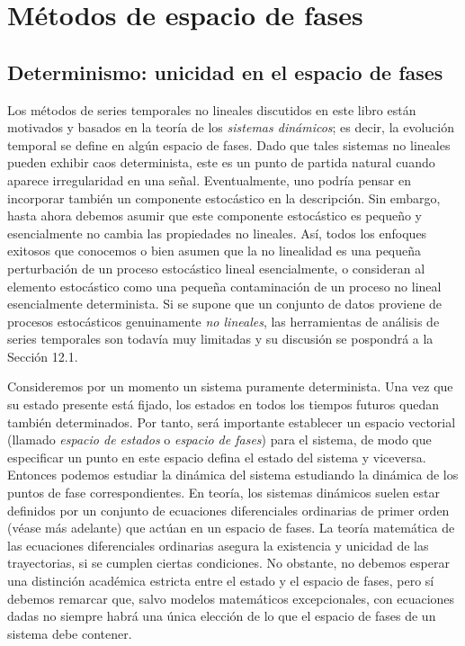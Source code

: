 \documentclass[10pt,a4paper]{book}
\begin{document}
\newpage

\chapter{Métodos de espacio de fases}
\section{Determinismo: unicidad en el espacio de fases}

Los métodos de series temporales no lineales discutidos en este libro están motivados y basados en la teoría de los \textit{sistemas dinámicos}; es decir, la evolución temporal se define en algún espacio de fases. Dado que tales sistemas no lineales pueden exhibir caos determinista, este es un punto de partida natural cuando aparece irregularidad en una señal. Eventualmente, uno podría pensar en incorporar también un componente estocástico en la descripción. Sin embargo, hasta ahora debemos asumir que este componente estocástico es pequeño y esencialmente no cambia las propiedades no lineales. Así, todos los enfoques exitosos que conocemos o bien asumen que la no linealidad es una pequeña perturbación de un proceso estocástico lineal esencialmente, o consideran al elemento estocástico como una pequeña contaminación de un proceso no lineal esencialmente determinista. Si se supone que un conjunto de datos proviene de procesos estocásticos genuinamente \textit{no lineales}, las herramientas de análisis de series temporales son todavía muy limitadas y su discusión se pospondrá a la Sección 12.1.

Consideremos por un momento un sistema puramente determinista. Una vez que su estado presente está fijado, los estados en todos los tiempos futuros quedan también determinados. Por tanto, será importante establecer un espacio vectorial (llamado \textit{espacio de estados} o \textit{espacio de fases}) para el sistema, de modo que especificar un punto en este espacio defina el estado del sistema y viceversa. Entonces podemos estudiar la dinámica del sistema estudiando la dinámica de los puntos de fase correspondientes. En teoría, los sistemas dinámicos suelen estar definidos por un conjunto de ecuaciones diferenciales ordinarias de primer orden (véase más adelante) que actúan en un espacio de fases. La teoría matemática de las ecuaciones diferenciales ordinarias asegura la existencia y unicidad de las trayectorias, si se cumplen ciertas condiciones. No obstante, no debemos esperar una distinción académica estricta entre el estado y el espacio de fases, pero sí debemos remarcar que, salvo modelos matemáticos excepcionales, con ecuaciones dadas no siempre habrá una única elección de lo que el espacio de fases de un sistema debe contener.
\end{document}

